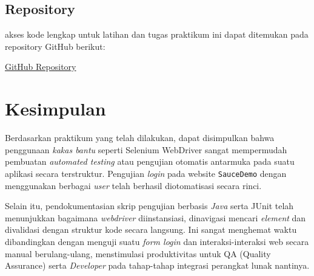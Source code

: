 \documentclass[a4paper,oneside,12pt]{report}
\renewcommand{\bibname}{Daftar Pustaka}
\begin{document}

\section*{Repository}
akses kode lengkap untuk latihan dan tugas praktikum ini dapat ditemukan pada repository GitHub berikut:
\begin{center}
    \href{https://github.com/januarsyah901/PPPL/tree/19b29728e5362f4d3336b97a6b78a093685de30e/Pertemuan%207}{GitHub Repository}
\end{center}

\clearpage

\chapter{Kesimpulan}

Berdasarkan praktikum yang telah dilakukan, dapat disimpulkan bahwa penggunaan \textit{kakas bantu} seperti Selenium WebDriver sangat mempermudah pembuatan \textit{automated testing} atau pengujian otomatis antarmuka pada suatu aplikasi secara terstruktur. Pengujian \textit{login} pada website \texttt{SauceDemo} dengan menggunakan berbagai \textit{user} telah berhasil diotomatisasi secara rinci. 

Selain itu, pendokumentasian skrip pengujian berbasis \textit{Java} serta JUnit telah menunjukkan bagaimana \textit{webdriver} diinstansiasi, dinavigasi mencari \textit{element} dan divalidasi dengan struktur kode secara langsung. Ini sangat menghemat waktu dibandingkan dengan menguji suatu \textit{form login} dan interaksi-interaksi web secara manual berulang-ulang, menstimulasi produktivitas untuk QA (Quality Assurance) serta \textit{Developer} pada tahap-tahap integrasi perangkat lunak nantinya.


\end{document}
